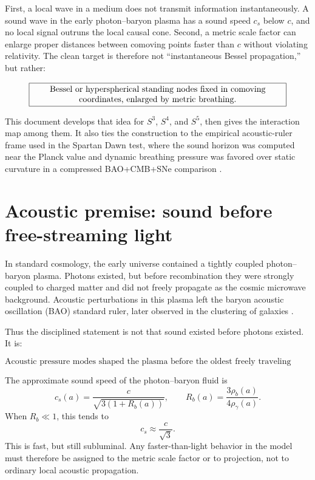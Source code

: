 \documentclass[11pt]{article}
\begin{document}
First, a local wave in a medium does not transmit information instantaneously.  A sound wave in the early photon--baryon plasma has a sound speed $c_s$ below $c$, and no local signal outruns the local causal cone.  Second, a metric scale factor can enlarge proper distances between comoving points faster than $c$ without violating relativity.  The clean target is therefore not ``instantaneous Bessel propagation,'' but rather:

\begin{equation}
\boxed{\begin{minipage}{0.86\linewidth}\centering
Bessel or hyperspherical standing nodes fixed in comoving coordinates, enlarged by metric breathing.
\end{minipage}}
\end{equation}

This document develops that idea for $S^3$, $S^4$, and $S^5$, then gives the interaction map among them.  It also ties the construction to the empirical acoustic-ruler frame used in the Spartan Dawn test, where the sound horizon was computed near the Planck value and dynamic breathing pressure was favored over static curvature in a compressed BAO+CMB+SNe comparison \citep{TrawinSpartanDawn2026,Planck2018VI,DESIDR2BAO2025}.

\section{Acoustic premise: sound before free-streaming light}

In standard cosmology, the early universe contained a tightly coupled photon--baryon plasma.  Photons existed, but before recombination they were strongly coupled to charged matter and did not freely propagate as the cosmic microwave background.  Acoustic perturbations in this plasma left the baryon acoustic oscillation (BAO) standard ruler, later observed in the clustering of galaxies \citep{Dodelson2003,NASABAO2020,ESAEuclidBAO2020}.

Thus the disciplined statement is not that sound existed before photons existed.  It is:

\begin{equation}
\boxed{\text{Acoustic pressure modes shaped the plasma before the oldest freely traveling light was released.}}
\end{equation}

The approximate sound speed of the photon--baryon fluid is
\begin{equation}
 c_s(a)=\frac{c}{\sqrt{3(1+R_b(a))}},
 \qquad
 R_b(a)=\frac{3\rho_b(a)}{4\rho_\gamma(a)}.
\end{equation}
When $R_b\ll 1$, this tends to
\begin{equation}
 c_s\approx \frac{c}{\sqrt{3}}.
\end{equation}
This is fast, but still subluminal.  Any faster-than-light behavior in the model must therefore be assigned to the metric scale factor or to projection, not to ordinary local acoustic propagation.
\end{document}
